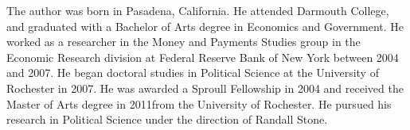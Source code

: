 The author was born in Pasadena, California. 
He attended Darmouth College, and graduated with a Bachelor of Arts degree in Economics and Government.
He worked as a researcher in the Money and Payments Studies group in the Economic Research division at Federal Reserve Bank of New York between 2004 and 2007.
He began doctoral studies in Political Science at the University of Rochester in 2007.
He was awarded a Sproull Fellowship in 2004 and received the Master of Arts degree in 2011from the University of Rochester.
He pursued his research in Political Science under the direction of Randall Stone.

\bigskip\noindent%

